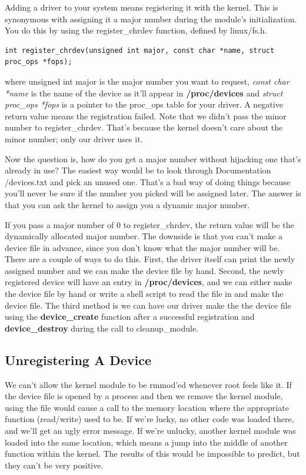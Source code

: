 \documentclass[11pt]{article}
\begin{document}
Adding a driver to your system means registering it with the kernel. This is synonymous with assigning it a major number during the module's initialization. You do this by using the register\_chrdev function, defined by linux/fs.h.

\begin{verbatim}
int register_chrdev(unsigned int major, const char *name, struct proc_ops *fops);
\end{verbatim}

where unsigned int major is the major number you want to request, \emph{const char *name} is the name of the device as it'll appear in \textbf{/proc/devices} and \emph{struct proc\_ops *fops} is a pointer to the proc\_ops table for your driver. A negative return value means the registration failed. Note that we didn't pass the minor number to register\_chrdev. That's because the kernel doesn't care about the minor number; only our driver uses it.

Now the question is, how do you get a major number without hijacking one that's already in use? The easiest way would be to look through Documentation /devices.txt and pick an unused one. That's a bad way of doing things because you'll never be sure if the number you picked will be assigned later. The answer is that you can ask the kernel to assign you a dynamic major number.

If you pass a major number of 0 to register\_chrdev, the return value will be the dynamically allocated major number. The downside is that you can't make a device file in advance, since you don't know what the major number will be. There are a couple of ways to do this. First, the driver itself can print the newly assigned number and we can make the device file by hand. Second, the newly registered device will have an entry in \textbf{/proc/devices}, and we can either make the device file by hand or write a shell script to read the file in and make the device file. The third method is we can have our driver make the the device file using the \textbf{device\_create} function after a successful registration and \textbf{device\_destroy} during the call to cleanup\_module.

\subsection{Unregistering A Device}
\label{sec:org9c60028}
We can't allow the kernel module to be rmmod'ed whenever root feels like it. If the device file is opened by a process and then we remove the kernel module, using the file would cause a call to the memory location where the appropriate function (read/write) used to be. If we're lucky, no other code was loaded there, and we'll get an ugly error message. If we're unlucky, another kernel module was loaded into the same location, which means a jump into the middle of another function within the kernel. The results of this would be impossible to predict, but they can't be very positive.
\end{document}
